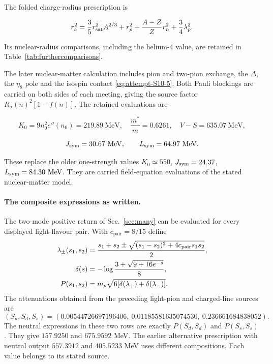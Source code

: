 \documentclass[aps,prx,onecolumn,10pt,notitlepage,nofootinbib,longbibliography]{revtex4-2}
\numberwithin{equation}{section}
\numberwithin{table}{section}
\begin{document}
The folded charge-radius prescription is

\begin{equation}
r_c^2=\frac35r_{\rm sat}^2A^{2/3}+r_p^2+\frac{A-Z}{Z}r_n^2+\frac34\lambda_p^2.
\label{eq:attempt-S12-5}
\end{equation}

Its nuclear-radius comparisons, including the helium-4 value, are retained
in Table~\ref{tab:furthercomparisons}.

The later nuclear-matter calculation includes pion and two-pion exchange, the \(\Delta\), the \(\eta_8\) pole and the isospin contact \eqref{eq:attempt-S10-5}. Both Pauli blockings are carried on both sides of each meeting, giving the source factor \(R_\sigma(n)^2[1-f(n)]\). The retained evaluations are

\begin{equation}
K_0=9n_0^2e''(n_0)=219.89\ \mathrm{MeV},\quad
\frac{m^*}{m}=0.6261,\quad V-S=635.07\ \mathrm{MeV},
\end{equation}

\begin{equation}
J_{\rm sym}=30.67\ \mathrm{MeV},\qquad L_{\rm sym}=64.97\ \mathrm{MeV}.
\label{eq:attempt-S12-6}
\end{equation}

These replace the older one-strength values \(K_0\simeq550\), \(J_{\rm sym}=24.37\), \(L_{\rm sym}=84.30\ \mathrm{MeV}\). They are carried field-equation evaluations of the stated nuclear-matter model.

\paragraph*{The composite expressions as written.}
\label{sec:literalcompositesSI}

The two-mode positive return of Sec.~\ref{sec:many} can be evaluated for every displayed light-flavour pair. With $c_{\mathrm{pair}}=8/15$ define
\begin{align}
 \lambda_\pm(s_1,s_2)&=
 \frac{s_1+s_2\pm\sqrt{(s_1-s_2)^2+4c_{\mathrm{pair}}s_1s_2}}2,\notag\\
 \delta(s)&=-\log\frac{3+\sqrt{9+16e^{-s}}}{8},\notag\\
 P(s_1,s_2)&=m_p\sqrt{6[\delta(\lambda_+)+\delta(\lambda_-)]}.
 \label{eq:literalpairSI}
\end{align}
The attenuations obtained from the preceding light-pion and charged-line sources are
\begin{equation}
 (S_u,S_d,S_s)
 =(0.00544726697196406,\ 0.01185581635074530,\ 0.236661684838052).
 \label{eq:literalattenuationsSI}
\end{equation}
The neutral expressions in these two rows are exactly $P(S_d,S_d)$ and $P(S_s,S_s)$. They give $157.9250$ and $675.9592$ MeV. The earlier alternative prescription with neutral output $557.3912$ and $405.5233$ MeV uses different compositions. Each value belongs to its stated source.
\end{document}
